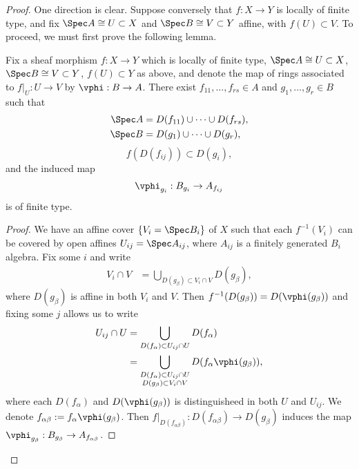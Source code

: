 \documentclass[12pt]{amsart}
\begin{document}
\begin{proof}
  One direction is clear.
  Suppose conversely that $f:X\to Y$ is locally of finite type, and fix $\Spec A\cong U\subset X$ and $\Spec B\cong V\subset Y$ affine, with $f(U)\subset V$.
  To proceed, we must first prove the following lemma.

  \begin{lemma}
    Fix a sheaf morphism $f:X\to Y$ which is locally of finite type, $\Spec A\cong U\subset X$, $\Spec B\cong V\subset Y$, $f(U)\subset Y$ as above, and denote the map of rings associated to $f|_U:U\to V$ by $\vphi:B\to A$.
    There exist $f_{11},\ldots, f_{rs}\in A$ and $g_1,\ldots, g_r\in B$ such that
    \begin{align*}
      \Spec A &= D(f_{11})\cup\cdots \cup D(f_{rs}), \\
      \Spec B &= D(g_1)\cup \cdots \cup D(g_r),
    \end{align*}
    \[
      f(D(f_{ij}))\subset D(g_i),
    \] 
    and the induced map
    \begin{align*}
      \vphi_{g_i}: B_{g_i}\to A_{f_{ij}}
    \end{align*}
    is of finite type.
  \end{lemma}

  \begin{proof}
    We have an affine cover $\{V_i=\Spec B_i\}$ of $X$ such that each $f^{-1}(V_i)$ can be covered by open affines $U_{ij}=\Spec A_{ij}$, where $A_{ij}$ is a finitely generated $B_i$ algebra.
    Fix some $i$ and write
    \begin{align*}
      V_i\cap V &= \bigcup_{D(g_\beta)\subset V_i\cap V}D(g_\beta),
    \end{align*}
    where $D(g_\beta)$ is affine in both $V_i$ and $V$.
    Then $f^{-1}(D(g_\beta))=D(\vphi(g_\beta))$ and fixing some $j$ allows us to write
    \begin{align*}
      U_{ij}\cap U &= \bigcup_{D(f_\alpha)\subset U_{ij}\cap U}D(f_\alpha) \\
             &= \bigcup_{\substack{D(f_\alpha) \subset U_{ij}\cap U \\ D(g_\beta)\subset V_i\cap V}} 
             D(f_\alpha\vphi(g_\beta)),
    \end{align*}
    where each $D(f_\alpha)$ and $D(\vphi(g_\beta))$ is distinguisheed in both $U$ and $U_{ij}$.
    We denote $f_{\alpha\beta}:= f_{\alpha} \vphi(g_\beta)$.
    Then $f|_{D(f_{\alpha\beta})}:D(f_{\alpha\beta}) \to D(g_\beta)$ induces the map $\vphi_{g_\beta}: B_{g_\beta}\to A_{f_{\alpha\beta}}$.


\end{proof}
\end{proof}
\end{document}
